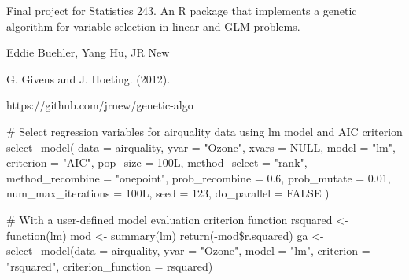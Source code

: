%
\begin{Description}\relax
Final project for Statistics 243. An R package that implements a genetic algorithm for variable selection in linear and GLM problems.
\end{Description}
%
\begin{Details}\relax

\end{Details}
%
\begin{Author}\relax
Eddie Buehler, Yang Hu, JR New
\end{Author}
%
\begin{References}\relax
G. Givens and J. Hoeting.  (2012).
\end{References}
%
\begin{SeeAlso}\relax
https://github.com/jrnew/genetic-algo
\end{SeeAlso}
%
\begin{Examples}
\begin{ExampleCode}
# Select regression variables for airquality data using lm model and AIC criterion
select_model(
  data = airquality,
  yvar = "Ozone",
  xvars = NULL,
  model = "lm",
  criterion = "AIC",
  pop_size = 100L,
  method_select = "rank",
  method_recombine = "onepoint",
  prob_recombine = 0.6,
  prob_mutate = 0.01,
  num_max_iterations = 100L,
  seed = 123,
  do_parallel = FALSE
)

# With a user-defined model evaluation criterion function
rsquared <- function(lm) {
  mod <- summary(lm)
  return(-mod\$r.squared)
}
ga <- select_model(data = airquality,
                   yvar = "Ozone",
                   model = "lm",
                   criterion = "rsquared",
                   criterion_function = rsquared)
\end{ExampleCode}
\end{Examples}
